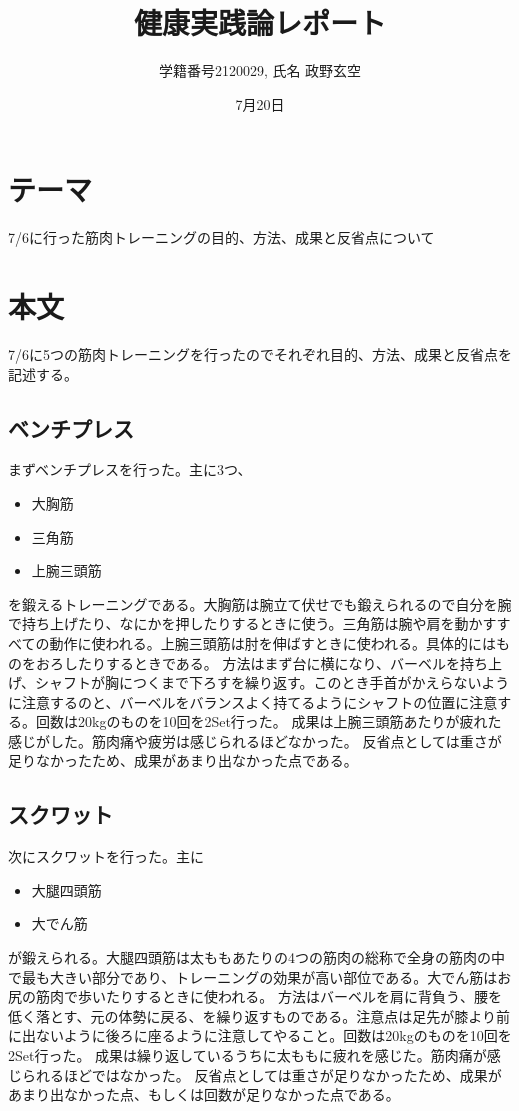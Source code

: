 \documentclass[12pt,a4j]{jarticle}
\begin{document}
\title{健康実践論レポート}
\author{学籍番号2120029, 氏名 政野玄空}
\date{7月20日}
\maketitle

\section{テーマ}
7/6に行った筋肉トレーニングの目的、方法、成果と反省点について
\section{本文}
7/6に5つの筋肉トレーニングを行ったのでそれぞれ目的、方法、成果と反省点を記述する。
\subsection{ベンチプレス}
まずベンチプレスを行った。主に3つ、
\begin{itemize}
\item 大胸筋
\item 三角筋
\item 上腕三頭筋
\end{itemize}
を鍛えるトレーニングである。大胸筋は腕立て伏せでも鍛えられるので自分を腕で持ち上げたり、なにかを押したりするときに使う。三角筋は腕や肩を動かすすべての動作に使われる。上腕三頭筋は肘を伸ばすときに使われる。具体的にはものをおろしたりするときである。
方法はまず台に横になり、バーベルを持ち上げ、シャフトが胸につくまで下ろすを繰り返す。このとき手首がかえらないように注意するのと、バーベルをバランスよく持てるようにシャフトの位置に注意する。回数は20kgのものを10回を2Set行った。
成果は上腕三頭筋あたりが疲れた感じがした。筋肉痛や疲労は感じられるほどなかった。
反省点としては重さが足りなかったため、成果があまり出なかった点である。
\subsection{スクワット}
次にスクワットを行った。主に
\begin{itemize}
\item 大腿四頭筋
\item 大でん筋
\end{itemize}
が鍛えられる。大腿四頭筋は太ももあたりの4つの筋肉の総称で全身の筋肉の中で最も大きい部分であり、トレーニングの効果が高い部位である。大でん筋はお尻の筋肉で歩いたりするときに使われる。
方法はバーベルを肩に背負う、腰を低く落とす、元の体勢に戻る、を繰り返すものである。注意点は足先が膝より前に出ないように後ろに座るように注意してやること。回数は20kgのものを10回を2Set行った。
成果は繰り返しているうちに太ももに疲れを感じた。筋肉痛が感じられるほどではなかった。
反省点としては重さが足りなかったため、成果があまり出なかった点、もしくは回数が足りなかった点である。
\end{document}
